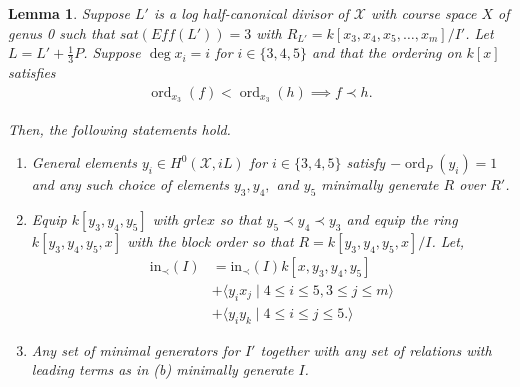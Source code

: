 \documentclass{amsart}
\theoremstyle{plain}
\newtheorem{lem}[thm]{Lemma}
\theoremstyle{definition}
\theoremstyle{remark}
\numberwithin{equation}{section}
\newcommand \sx{\mathscr X}
\DeclareMathOperator{\ord}{ord}
\newcommand \halfcan{L}
\newcommand \initial{\text{in}}
\begin{document}
\begin{lem}
\label{lem:sat-three-induction-g-0}
Suppose $L'$ is a log half-canonical divisor of $\sx$ with course
space $X$ of genus 0 such that $sat(Eff(\halfcan')) = 3$ with $R_
{\halfcan'} = k[x_3, x_4 , x_5,\ldots, x_m]/I'$.  Let $L = L' + \frac
{1}{3}P$.  Suppose $\deg x_i = i$ for $i \in \{3, 4, 5\}$ and that
the ordering on $k[x]$ satisfies
\begin{align*}
	\ord_{x_3}(f) < \ord_{x_3}(h) \implies f \prec h.
\end{align*}

\noindent
Then, the following statements hold.

\begin{enumerate}
	\item[(a)] General elements  $y_i \in H^0(\sx,iL)$ for $i \in \{3,
		4,5\}$ satisfy $-\ord_P(y_i) = 1$ and any such choice of elements $y
		_3,y_4,$ and $y_5$ minimally generate $R$ over $R'$.
	\item[(b)] Equip $k[y_3, y_4, y_5]$ with $grlex$ so that $y_5 \prec 
		y_4 \prec y_3$
		and equip the ring $k[y_3, y_4, y_5, x]$ with the block 
		order so that $R = k[y_3, y_4, y_5, x]/I$. Let,
		\begin{align*}
			\initial_\prec(I) &= \initial_\prec(I)k[x,y_3,y_4,y_5] \\
			&+\langle y_i x_j \mid 4 \leq i \leq 5, 3 \leq j \leq m\rangle \\
			&+\langle y_iy_k \mid 4 \leq i \leq j \leq 5.\rangle 
		\end{align*}
	\item[(c)] Any set of minimal generators for $I'$ together with 
		any set of relations with leading terms as in (b) minimally 
		generate $I$.
\end{enumerate}
\end{lem}
\end{document}
